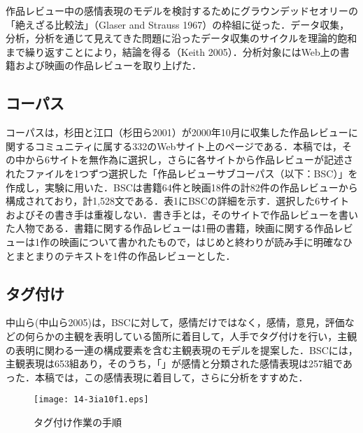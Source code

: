 \documentclass[japanese]{jnlp_1.3a}
\begin{document}
作品レビュー中の感情表現のモデルを検討するためにグラウンデッドセオリーの「絶えざる比較法」（Glaser 
and Strauss 1967）の枠組に従った．データ収集，分析，分析を通じて見えてきた問題に沿ったデータ収集のサイクルを理論的飽和まで繰り返すことにより，結論を得る（Keith 2005）．分析対象にはWeb上の書籍および映画の作品レビューを取り上げた．

\subsection{コーパス}

コーパスは，杉田と江口（杉田ら2001）が2000年10月に収集した作品レビューに関するコミュニティに属する332のWebサイト上のページである．本稿では，その中から6サイトを無作為に選択し，さらに各サイトから作品レビューが記述されたファイルを1つずつ選択した「作品レビューサブコーパス（以下：BSC）」を作成し，実験に用いた．BSCは書籍64件と映画18件の計82件の作品レビューから構成されており，計1,528文である．表1にBSCの詳細を示す．選択した6サイトおよびその書き手は重複しない．書き手とは，そのサイトで作品レビューを書いた人物である．書籍に関する作品レビューは1冊の書籍，映画に関する作品レビューは1作の映画について書かれたもので，はじめと終わりが読み手に明確なひとまとまりのテキストを1件の作品レビューとした．

\begin{table}[b]
\begin{center}

\end{center}
\end{table}

\subsection{タグ付け}

中山ら(中山ら2005)は，BSCに対して，感情だけではなく，感情，意見，評価などの何らかの主観を表明している箇所に着目して，人手でタグ付けを行い，主観の表明に関わる一連の構成要素を含む主観表現のモデルを提案した．BSCには，主観表現は653組あり，そのうち，「」が感情と分類された感情表現は257組であった．本稿では，この感情表現に着目して，さらに分析をすすめた．

\begin{figure}[b]
\centerline{\texttt{[image: 14-3ia10f1.eps]}}
\caption{タグ付け作業の手順}
\end{figure}
\end{document}
